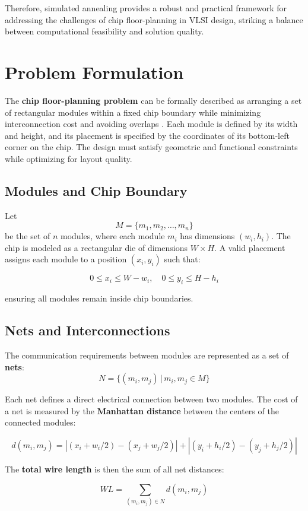 \documentclass[9pt,a4paper,twoside]{rho-class/rho}
\begin{document}
Therefore, simulated annealing provides a robust and practical framework for addressing the challenges of chip floor-planning in VLSI design, striking a balance between computational feasibility and solution quality.  

\section{Problem Formulation}

The \textbf{chip floor-planning problem} can be formally described as arranging a set of rectangular modules within a fixed chip boundary while minimizing interconnection cost and avoiding overlaps \cite{Sherwani}. Each module is defined by its width and height, and its placement is specified by the coordinates of its bottom-left corner on the chip. The design must satisfy geometric and functional constraints while optimizing for layout quality.  

\subsection{Modules and Chip Boundary}
Let
\[
M = \{m_1, m_2, \dots, m_n\}
\]
be the set of $n$ modules, where each module $m_i$ has dimensions $(w_i, h_i)$. The chip is modeled as a rectangular die of dimensions $W \times H$. A valid placement assigns each module to a position $(x_i, y_i)$ such that:  

\[
0 \leq x_i \leq W - w_i, \quad 0 \leq y_i \leq H - h_i
\]

ensuring all modules remain inside chip boundaries.  

\subsection{Nets and Interconnections}
The communication requirements between modules are represented as a set of \textbf{nets}:  
\[
N = \{ (m_i, m_j) \,|\, m_i, m_j \in M \}
\]

Each net defines a direct electrical connection between two modules. The cost of a net is measured by the \textbf{Manhattan distance} between the centers of the connected modules:  

\[
d(m_i, m_j) = |(x_i + w_i/2) - (x_j + w_j/2)| + |(y_i + h_i/2) - (y_j + h_j/2)|
\]

The \textbf{total wire length} is then the sum of all net distances:  

\[
WL = \sum_{(m_i, m_j) \in N} d(m_i, m_j)
\]
\end{document}
